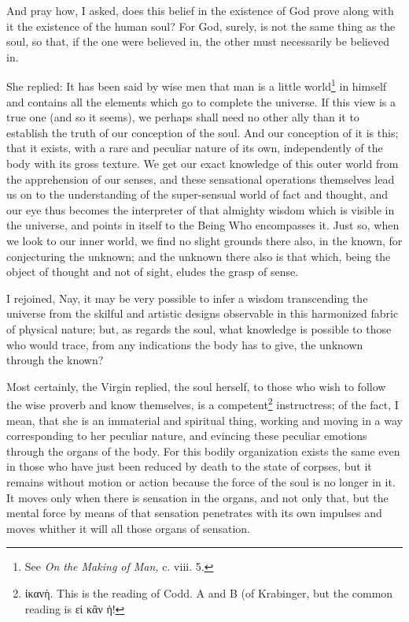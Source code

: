 And pray how, I asked, does this belief in the existence of God prove along with it the existence of the human soul? For God, surely, is not the same thing as the soul, so that, if the one were believed in, the other must necessarily be believed in.

She replied: It has been said by wise men that man is a little world\footnote{See \emph{On the Making of Man,} c. viii. 5.} in himself and contains all the elements which go to complete the universe. If this view is a true one (and so it seems), we perhaps shall need no other ally than it to establish the truth of our conception of the soul. And our conception of it is this; that it exists, with a rare and peculiar nature of its own, independently of the body with its gross texture. We get our exact knowledge of this outer world from the apprehension of our senses, and these sensational operations themselves lead us on to the understanding of the super-sensual world of fact and thought, and our eye thus becomes the interpreter of that almighty wisdom which is visible in the universe, and points in itself to the Being Who encompasses it. Just so, when we look to our inner world, we find no slight grounds there also, in the known, for conjecturing the unknown; and the unknown there also is that which, being the object of thought and not of sight, eludes the grasp of sense.

I rejoined, Nay, it may be very possible to infer a wisdom transcending the universe from the skilful and artistic designs observable in this harmonized fabric of physical nature; but, as regards the soul, what knowledge is possible to those who would trace, from any indications the body has to give, the unknown through the known?

Most certainly, the Virgin replied, the soul herself, to those who wish to follow the wise proverb and know themselves, is a competent\footnote{\textgreek{ἱκανὴ}. This is the reading of Codd. A and B (of Krabinger, but the common reading is \textgreek{εἰ κἂν ἡ!}} instructress; of the fact, I mean, that she is an immaterial and spiritual thing, working and moving in a way corresponding to her peculiar nature, and evincing these peculiar emotions through the organs of the body. For this bodily organization exists the same even in those who have just been reduced by death to the state of corpses, but it remains without motion or action because the force of the soul is no longer in it. It moves only when there is sensation in the organs, and not only that, but the mental force by means of that sensation penetrates with its own impulses and moves whither it will all those organs of sensation.


